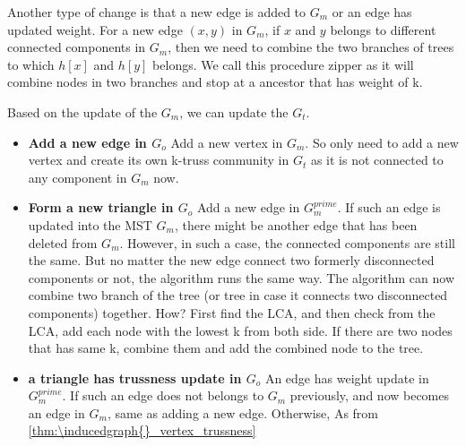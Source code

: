 Another type of change is that a new edge is added to $G_m$ or an edge has updated weight. For a new edge $(x,y)$ in $G_m$, if $x$ and $y$ belongs to different connected components in $G_m$, then we need to combine the two branches of trees to which $h[x]$ and $h[y]$ belongs. We call this procedure zipper as it will combine nodes in two branches and stop at a ancestor that has weight of k. 



Based on the update of the \inducedgraph{} $G_m$, we can update the \treeindex{} $G_t$. 
\begin{itemize}
	\item \textbf{Add a new edge in $G_o$} Add a new vertex in $G_m$. So only need to add a new vertex and create its own k-truss community in $G_t$ as it is not connected to any component in $G_m$ now.
	\item \textbf{Form a new triangle in $G_o$} Add a new edge in $G_{m}^{prime}$. If such an edge is updated into the MST $G_m$, there might be another edge that has been deleted from $G_m$. However, in such a case, the connected components are still the same. But no matter the new edge connect two formerly disconnected components or not, the algorithm runs the same way. The algorithm can now combine two branch of the tree (or tree in case it connects two disconnected components) together. How?  First find the LCA, and then check from the LCA, add each node with the lowest k from both side. If there are two nodes that has same k, combine them and add the combined node to the tree.
	\item \textbf{a triangle has trussness update in $G_o$} An edge has weight update in $G_{m}^{prime}$. If such an edge does not belongs to $G_m$ previously, and now becomes an edge in $G_m$, same as adding a new edge. Otherwise, As from \autoref{thm:\inducedgraph{}_vertex_trussness}
	
\end{itemize}
